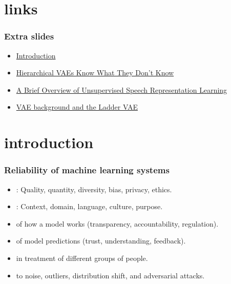 
\section[Extra Slides]{links}

\begin{frame}
    \frametitle{Extra slides}
    \begin{itemize}
        \item \hyperlink{extra:introduction}{Introduction}
        \item \hyperlink{extra:hierarchical}{Hierarchical VAEs Know What They Don't Know}
        \item \hyperlink{extra:brief}{A Brief Overview of Unsupervised Speech Representation Learning}
        \item \hyperlink{extra:ladder-vae}{VAE background and the Ladder VAE}
    \end{itemize}
\end{frame}


\section[Introduction]{introduction}\label{extra:introduction}


\begin{frame}
    \frametitle{Reliability of machine learning systems}
    \begin{itemize}
        \item <1-> : Quality, quantity, diversity, bias, privacy, ethics.
        \item <1-> : Context, domain, language, culture, purpose.
        \vspace{1em}
        \item <2->  of how a model works (transparency, accountability, regulation).
        \item <2->  of model predictions (trust, understanding, feedback).
        \item <2->  in treatment of different groups of people.
        \item <2->  to noise, outliers, distribution shift, and adversarial attacks.
    \end{itemize}

\end{frame}



